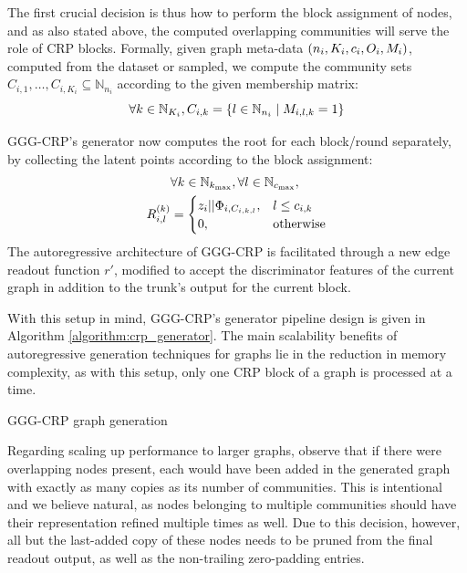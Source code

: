 The first crucial decision is thus how to perform the block assignment of nodes, and as also stated above, the computed overlapping communities will serve the role of CRP blocks. Formally, given graph meta-data $\mathopen{}\left(n_i, K_i, c_i, O_i, M_i\right)$, computed from the dataset or sampled, we compute the community sets $C_{i,1},\dots,C_{i,K_i} \subseteq \mathbb{N}_{n_i}$ according to the given membership matrix: $$\forall k \in \mathbb{N}_{K_i},C_{i,k}=\mathopen{}\left\{l \in \mathbb{N}_{n_i} \mid M_{i,l,k} = 1\right\}$$

GGG-CRP's generator now computes the root for each block/round separately, by collecting the latent points according to the block assignment:
\begin{align*}
&\forall k \in \mathbb{N}_{k_{\max}}, \forall l \in \mathbb{N}_{c_{\max}}, \\
R_{i,l}^{\mathopen{}\left(k\right)} &= \begin{cases} z_i||\Phi_{i,C_{i,k,l}}, & l \leq c_{i,k} \\ 0, & \text{otherwise} \end{cases}
\end{align*}
The autoregressive architecture of GGG-CRP is facilitated through a new edge readout function $r'$, modified to accept the discriminator features of the current graph in addition to the trunk's output for the current block. 

With this setup in mind, GGG-CRP's generator pipeline design is given in Algorithm \ref{algorithm:crp_generator}. The main scalability benefits of autoregressive generation techniques for graphs lie in the reduction in memory complexity, as with this setup, only one CRP block of a graph is processed at a time.

\begin{algorithm}[H]
\caption{GGG-CRP graph generation}
\label{algorithm:crp_generator}
\begin{algorithmic}
\ENDFOR
{}
\end{algorithmic}
\end{algorithm} 

Regarding scaling up performance to larger graphs, observe that if there were overlapping nodes present, each would have been added in the generated graph with exactly as many copies as its number of communities. This is intentional and we believe natural, as nodes belonging to multiple communities should have their representation refined multiple times as well. Due to this decision, however, all but the last-added copy of these nodes needs to be pruned from the final readout output, as well as the non-trailing zero-padding entries.


